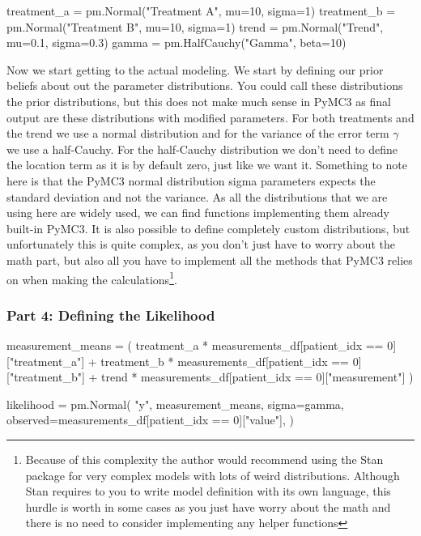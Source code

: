 \documentclass[12pt,a4paper,leqno]{report}
\theoremstyle{plain}
\theoremstyle{definition}
\theoremstyle{remark}
\begin{document}
\bigskip
\begin{pyverbatim}[][fontsize=\footnotesize]
treatment_a = pm.Normal("Treatment A", mu=10, sigma=1)
treatment_b = pm.Normal("Treatment B", mu=10, sigma=1)
trend = pm.Normal("Trend", mu=0.1, sigma=0.3)
gamma = pm.HalfCauchy("Gamma", beta=10)
\end{pyverbatim}
\bigskip

Now we start getting to the actual modeling. We start by defining our prior beliefs about
out the parameter distributions. You could call these distributions the prior
distributions, but this does not make much sense in PyMC3 as final output are these
distributions with modified parameters. For both treatments and the trend we use a normal distribution and
for the variance of the error term \(\gamma \) we use a half-Cauchy. For the half-Cauchy
distribution we don't need to define the location term as it is by default zero, just
like we want it. Something to note here is that the PyMC3 normal distribution sigma
parameters expects the standard deviation and not the variance. As all the distributions
that we are using here are widely used, we can find functions implementing
them already built-in PyMC3. It is also possible to define completely custom
distributions, but unfortunately this is quite complex, as you don't just have to worry
about the math part, but also all you have to implement all the methods that PyMC3
relies on when making the calculations\footnote{Because of this complexity the author would recommend using the Stan package for very complex models with lots of weird
distributions. Although Stan requires to you to write model definition with its own
language, this hurdle is worth in some cases as you just have
worry about the math and there is no need to consider implementing any helper functions}.

\subsubsection*{Part 4: Defining the Likelihood}

\bigskip
\begin{pyverbatim}[][fontsize=\footnotesize]
measurement_means = (
    treatment_a
    * measurements_df[patient_idx == 0]["treatment_a"]
    + treatment_b
    * measurements_df[patient_idx == 0]["treatment_b"]
    + trend
    * measurements_df[patient_idx == 0]["measurement"]
)

likelihood = pm.Normal(
    "y",
    measurement_means,
    sigma=gamma,
    observed=measurements_df[patient_idx == 0]["value"],
)
\end{pyverbatim}
\bigskip
\end{document}

